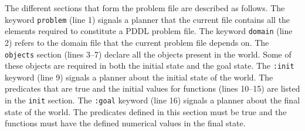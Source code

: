 The different sections that form the problem file are described as follows. The keyword \texttt{problem} (line 1) signals a planner that the current file contains all the elements required to constitute a PDDL problem file. The keyword \texttt{domain} (line 2) refers to the domain file that the current problem file depends on. The \texttt{objects} section (lines 3--7) declare all the objects present in the world. Some of these objects are required in both the initial state and the goal state. The \texttt{:init} keyword (line 9) signals a planner about the initial state of the world. The predicates that are true and the initial values for functions (lines 10--15) are listed in the \texttt{init} section. The \texttt{:goal} keyword (line 16) signals a planner about the final state of the world. The predicates defined in this section must be true and the functions must have the defined numerical values in the final state.

